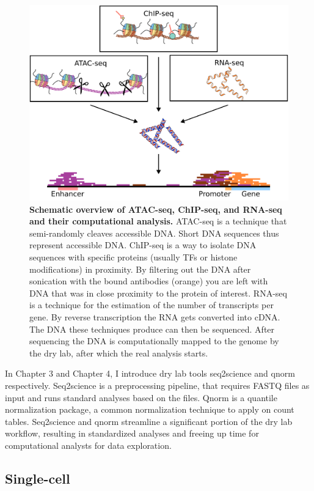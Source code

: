 \begin{figure}
    \center
    \includegraphics[width=0.8\linewidth]{ch.introduction/imgs/analysis.png}
    \caption{\textbf{Schematic overview of ATAC-seq, ChIP-seq, and RNA-seq and their computational analysis.} ATAC-seq is a technique that semi-randomly cleaves accessible DNA. Short DNA sequences thus represent accessible DNA. ChIP-seq is a way to isolate DNA sequences with specific proteins (usually TFs or histone modifications) in proximity. By filtering out the DNA after sonication with the bound antibodies (orange) you are left with DNA that was in close proximity to the protein of interest. RNA-seq is a technique for the estimation of the number of transcripts per gene. By reverse transcription the RNA gets converted into cDNA. The DNA these techniques produce can then be sequenced. After sequencing the DNA is computationally mapped to the genome by the dry lab, after which the real analysis starts. }
    \label{fig:analysis}
\end{figure}

In Chapter 3 and Chapter 4, I introduce dry lab tools seq2science and qnorm respectively. Seq2science is a preprocessing pipeline, that requires FASTQ files as input and runs standard analyses based on the files. Qnorm is a quantile normalization package, a common normalization technique to apply on count tables. Seq2science and qnorm streamline a significant portion of the dry lab workflow, resulting in standardized analyses and freeing up time for computational analysts for data exploration.

\subsection{Single-cell}


